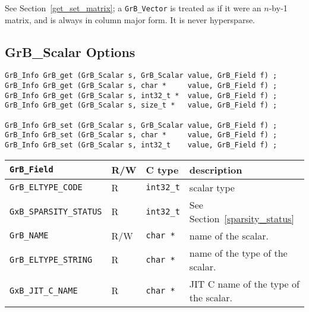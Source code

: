 See Section~\ref{get_set_matrix}; a \verb'GrB_Vector' is treated as if it were
an $n$-by-1 matrix, and is always in column major form.  It is never
hypersparse.

\subsection{{\sf GrB\_Scalar} Options}
\label{get_set_scalar}

\begin{mdframed}[userdefinedwidth=6in]
{\footnotesize
\begin{verbatim}
GrB_Info GrB_get (GrB_Scalar s, GrB_Scalar value, GrB_Field f) ;
GrB_Info GrB_get (GrB_Scalar s, char *     value, GrB_Field f) ;
GrB_Info GrB_get (GrB_Scalar s, int32_t *  value, GrB_Field f) ;
GrB_Info GrB_get (GrB_Scalar s, size_t *   value, GrB_Field f) ;

GrB_Info GrB_set (GrB_Scalar s, GrB_Scalar value, GrB_Field f) ;
GrB_Info GrB_set (GrB_Scalar s, char *     value, GrB_Field f) ;
GrB_Info GrB_set (GrB_Scalar s, int32_t    value, GrB_Field f) ;
\end{verbatim}
}\end{mdframed}

\noindent
{\small
\begin{tabular}{|l|l|l|p{3in}|}
\hline
\verb'GrB_Field'                    & R/W  & C type        & description \\
\hline

\verb'GrB_ELTYPE_CODE'              & R    & \verb'int32_t'& scalar type \\
\verb'GxB_SPARSITY_STATUS'          & R    & \verb'int32_t'& See Section~\ref{sparsity_status} \\
\hline
\verb'GrB_NAME'                     & R/W  & \verb'char *' & name of the scalar. \\
\verb'GrB_ELTYPE_STRING'            & R    & \verb'char *' & name of the type of the scalar. \\
\verb'GxB_JIT_C_NAME'               & R    & \verb'char *' & JIT C name of the type of the scalar. \\
\hline
\end{tabular}
}
\vspace{0.1in}


